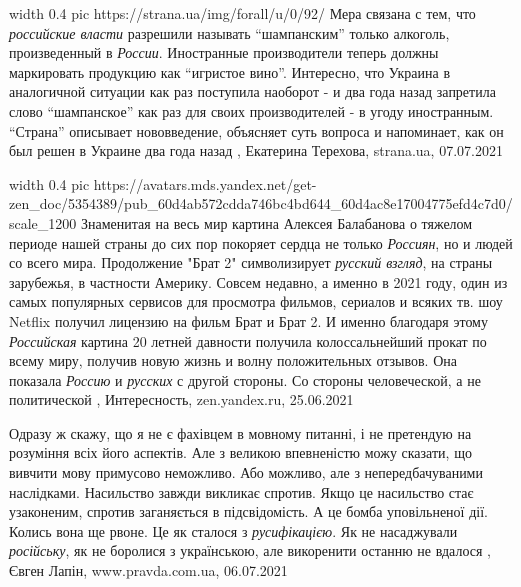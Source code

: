 \ifcmt
	width 0.4
  pic https://strana.ua/img/forall/u/0/92/%
\fi
Мера связана с тем, что \emph{российские власти} разрешили называть \enquote{шампанским}
только алкоголь, произведенный в \emph{России}. Иностранные производители теперь
должны маркировать продукцию как \enquote{игристое вино}.  Интересно, что Украина в
аналогичной ситуации как раз поступила наоборот - и два года назад запретила
слово \enquote{шампанское} как раз для своих производителей - в угоду иностранным.
\enquote{Страна} описывает нововведение, объясняет суть вопроса и напоминает, как он
был решен в Украине два года назад
, 
Екатерина Терехова, strana.ua, 07.07.2021 

\ifcmt
	width 0.4
  pic https://avatars.mds.yandex.net/get-zen_doc/5354389/pub_60d4ab572cdda746bc4bd644_60d4ac8e17004775efd4c7d0/scale_1200
\fi
Знаменитая на весь мир картина Алексея Балабанова о тяжелом периоде нашей
страны до сих пор покоряет сердца не только \emph{Россиян}, но и людей со всего
мира.  Продолжение "Брат 2" символизирует \emph{русский взгляд}, на страны
зарубежья, в частности Америку.  Совсем недавно, а именно в 2021 году, один из
самых популярных сервисов для просмотра фильмов, сериалов и всяких тв. шоу
Netflix получил лицензию на фильм Брат и Брат 2. И именно благодаря этому
\emph{Российская} картина 20 летней давности получила колоссальнейший прокат по
всему миру, получив новую жизнь и волну положительных отзывов. Она показала
\emph{Россию} и \emph{русских} с другой стороны. Со стороны человеческой, а не
политической
, 
Интересность, zen.yandex.ru, 25.06.2021

Одразу ж скажу, що я не є фахівцем в мовному питанні, і не претендую на
розуміння всіх його аспектів. Але з великою впевненістю можу сказати, що
вивчити мову примусово неможливо. Або можливо, але з непередбачуваними
наслідками.  Насильство завжди викликає спротив. Якщо це насильство стає
узаконеним, спротив заганяється в підсвідомість. А це бомба уповільненої дії.
Колись вона ще рвоне.  Це як сталося з \emph{русифікацією}. Як не насаджували
\emph{російську}, як не боролися з українською, але викоренити останню не вдалося
, 
Євген Лапін, www.pravda.com.ua, 06.07.2021

